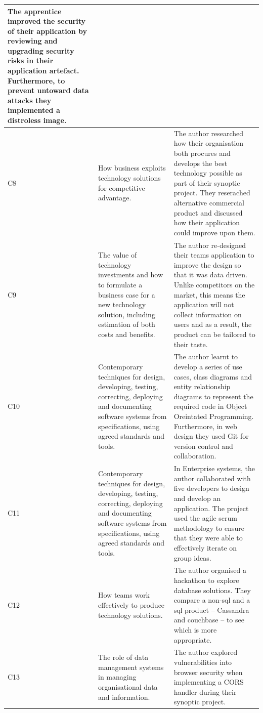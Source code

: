 \documentclass{article}
\begin{document}
\begin{landscape}
\begin{longtable}{|l|p{10cm}|p{10cm}|}
  The apprentice improved the   security of their application by reviewing and upgrading security risks in   their application artefact. Furthermore, to prevent untoward data attacks   they implemented a distroless image. \\ \hline
C8 &
  How business exploits   technology solutions for competitive advantage. &
  The author researched how their organisation both procures and   develops the best technology possible as part of their synoptic project. They   reserached alternative commercial product and discussed how their application   could improve upon them. \\ \hline
C9 &
  The value of technology   investments and how to formulate a business case for a new technology   solution, including estimation of both costs and benefits. &
  The author re-designed their teams application to improve the   design so that it was data driven. Unlike competitors on the market, this   means the application will not collect information on users and as a result,   the product can be tailored to their taste. \\ \hline
C10 &
  Contemporary techniques for   design, developing, testing, correcting, deploying and documenting software   systems from specifications, using agreed standards and tools. &
  The author learnt to develop a   series of use cases, class diagrams and entity relationship diagrams to   represent the required code in Object Oreintated Programming. Furthermore, in   web design they used Git for version control and collaboration. \\ \hline
C11 &
  Contemporary techniques for   design, developing, testing, correcting, deploying and documenting software   systems from specifications, using agreed standards and tools. &
  In Enterprise systems, the author collaborated with five   developers to design and develop an application. The project used the agile   scrum methodology to ensure that they were able to effectively iterate on   group ideas. \\ \hline
C12 &
  How teams work effectively to   produce technology solutions. &
  The author organised a hackathon to explore database   solutions. They compare a non-sql and a sql product – Cassandra and couchbase   – to see which is more appropriate. \\ \hline
C13 &
  The role of data management   systems in managing organisational data and information. &
  The author explored   vulnerabilities into browser security when implementing a CORS handler during   their synoptic project. \\ \hline

\end{longtable}
\end{landscape}
\end{document}
